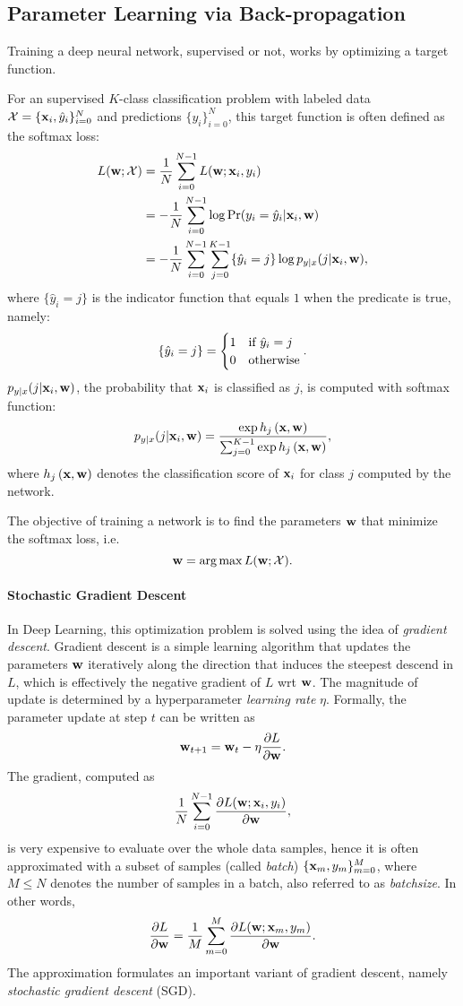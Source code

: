 \subsection{Parameter Learning via Back-propagation}
Training a deep neural network, supervised or not, works by optimizing a target function.

For an supervised $ K $-class classification problem with labeled data $ \mathcal{X} =  \lbrace\mathbf{x}_i, \hat{y}_i \rbrace_{i=0}^{N} $ and predictions $\lbrace y_i \rbrace_{i=0}^{N} $, this target function is often defined as the softmax loss:
\begin{align}
L(\mathbf{w}; \mathcal{X}) &= \dfrac{1}{N}\sum_{i=0}^{N-1} L(\mathbf{w}; \mathbf{x}_i, y_i)\nonumber\\
& = -\dfrac{1}{N}\sum_{i=0}^{N-1}\log \Pr(y_i = \hat{y}_i |\mathbf{x}_i, \mathbf{w})\label{eq:softmaxloss} \\
& = -\dfrac{1}{N}\sum_{i=0}^{N-1}\sum_{j=0}^{K-1}\lbrace \hat{y}_i = j \rbrace\log p_{y|x}(j|\mathbf{x}_i, \mathbf{w})\nonumber, 
\end{align}
where $ \lbrace \hat{y}_i = j \rbrace $ is the indicator function that equals $ 1 $ when the predicate is true, namely:
\[ \lbrace \hat{y}_i = j \rbrace = \begin{cases}
1 & \text{if $ \hat{y}_i = j $}\\
0 & \text{otherwise}
\end{cases} .\]
$ p_{y|x}( j|\mathbf{x}_i, \mathbf{w}) $, the probability that $ \mathbf{x}_i $  is classified as $ j $, is computed with softmax function:
\[ p_{y|x}(j|\mathbf{x}_i, \mathbf{w}) = \dfrac{\exp h_j\left(\mathbf{x},\mathbf{w}\right) }{ \sum_{j=0}^{K-1}\exp h_j\left(\mathbf{x},\mathbf{w}\right)}, \]
where $ h_j\left(\mathbf{x},\mathbf{w}\right) $ denotes the classification score of $ \mathbf{x}_i $ for class $ j $ computed by the network.

The objective of training a network is to find the parameters $ \mathbf{w} $ that minimize the softmax loss, i.e. 
\[ \mathbf{w} = \operatorname*{arg\,max} L(\mathbf{w}; \mathcal{X}). \]

\paragraph{Stochastic Gradient Descent}
In Deep Learning, this optimization problem is solved using the idea of \textit{gradient descent}. Gradient descent is a simple learning algorithm that updates the parameters $ \mathbf{w} $ iteratively along the direction that induces the steepest descend in $ L $, which is effectively the negative gradient of $ L $ wrt $ \mathbf{w} $. 
The magnitude of update is determined by a hyperparameter \textit{learning rate} $ \eta $. Formally, the parameter update at step $ t $ can be written as
\[ \mathbf{w}_{t+1} = \mathbf{w}_{t} - \eta\dfrac{\partial L}{\partial \mathbf{w}}. \]
The gradient, computed as \[ \dfrac{1}{N}\sum_{i=0}^{N-1} \dfrac{\partial L(\mathbf{w}; \mathbf{x}_i, y_i)}{\partial \mathbf{w}}, \] is very expensive to evaluate over the whole data samples, hence it is often approximated with a subset of samples (called \textit{batch}) $ \lbrace \mathbf{x}_m, y_m \rbrace_{m=0}^{M} $, where $ M \leq N$ denotes the number of samples in a batch, also referred to as \textit{batchsize}. In other words, 
\[ \dfrac{\partial L}{\partial \mathbf{w}} = \dfrac{1}{M}\sum_{m=0}^{M}\dfrac{\partial L(\mathbf{w}; \mathbf{x}_m, y_m)}{\partial \mathbf{w}}. \]
The approximation formulates an important variant of gradient descent, namely \textit{stochastic gradient descent} (SGD). 


